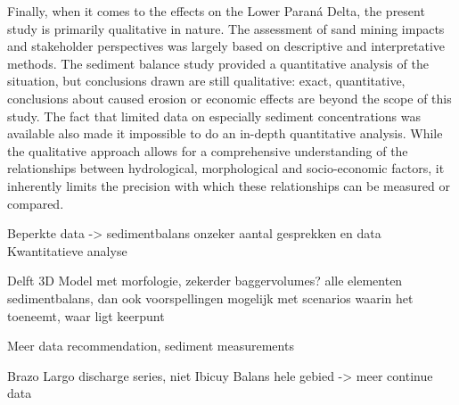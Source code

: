 Finally, when it comes to the effects on the Lower Paraná Delta, the present study is primarily qualitative in nature. The assessment of sand mining impacts and stakeholder perspectives was largely based on descriptive and interpretative methods. The sediment balance study provided a quantitative analysis of the situation, but conclusions drawn are still qualitative: exact, quantitative, conclusions about caused erosion or economic effects are beyond the scope of this study. The fact that limited data on especially sediment concentrations was available also made it impossible to do an in-depth quantitative analysis. While the qualitative approach allows for a comprehensive understanding of the relationships between hydrological, morphological and socio-economic factors, it inherently limits the precision with which these relationships can be measured or compared.



Beperkte data -> sedimentbalans onzeker aantal gesprekken en data
Kwantitatieve analyse

Delft 3D Model met morfologie, zekerder baggervolumes? alle elementen sedimentbalans, dan ook voorspellingen mogelijk met scenarios waarin het toeneemt, waar ligt keerpunt

Meer data recommendation, sediment measurements

Brazo Largo discharge series, niet Ibicuy
Balans hele gebied -> meer continue data




